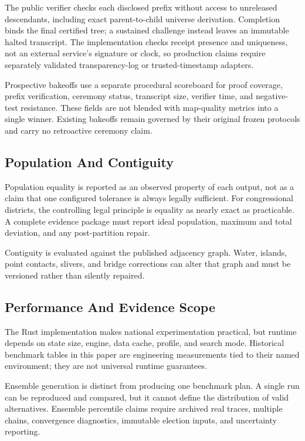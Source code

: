The public verifier checks each disclosed prefix without access to unreleased
descendants, including exact parent-to-child universe derivation. Completion
binds the final certified tree; a sustained challenge instead leaves an
immutable halted transcript. The implementation checks receipt presence and
uniqueness, not an external service's signature or clock, so production claims
require separately validated transparency-log or trusted-timestamp adapters.

Prospective bakeoffs use a separate procedural scoreboard for proof coverage,
prefix verification, ceremony status, transcript size, verifier time, and
negative-test resistance. These fields are not blended with map-quality
metrics into a single winner. Existing bakeoffs remain governed by their
original frozen protocols and carry no retroactive ceremony claim.

\subsection{Population And Contiguity}

Population equality is reported as an observed property of each output, not as
a claim that one configured tolerance is always legally sufficient. For
congressional districts, the controlling legal principle is equality as nearly
exact as practicable. A complete evidence package must report ideal population,
maximum and total deviation, and any post-partition repair.

Contiguity is evaluated against the published adjacency graph. Water, islands,
point contacts, slivers, and bridge corrections can alter that graph and must be
versioned rather than silently repaired.

\subsection{Performance And Evidence Scope}

The Rust implementation makes national experimentation practical, but runtime
depends on state size, engine, data cache, profile, and search mode. Historical
benchmark tables in this paper are engineering measurements tied to their named
environment; they are not universal runtime guarantees.

Ensemble generation is distinct from producing one benchmark plan. A single
run can be reproduced and compared, but it cannot define the distribution of
valid alternatives. Ensemble percentile claims require archived real traces,
multiple chains, convergence diagnostics, immutable election inputs, and
uncertainty reporting.

